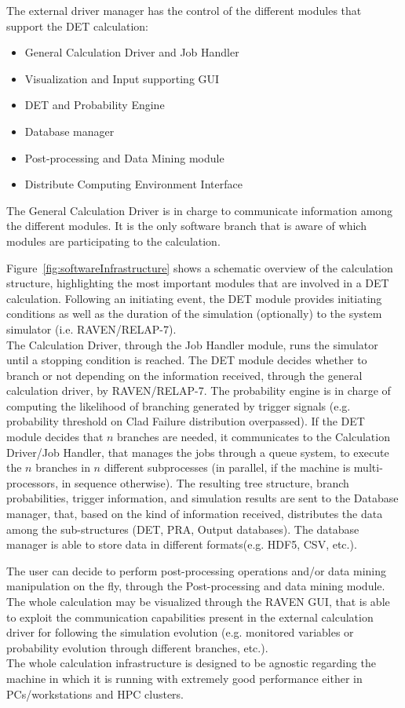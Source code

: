 The external driver manager has the control of the different modules that support the DET calculation:
\vspace{-5mm}
\begin{itemize}
\itemsep0em
\item General Calculation Driver and Job Handler
\item Visualization and Input supporting GUI
\item DET and Probability Engine
\item Database manager
\item Post-processing and Data Mining module
\item Distribute Computing Environment Interface
\end{itemize}
\vspace{-5mm}
The General Calculation Driver is in charge to communicate information among the different modules. It is the only software branch that is aware of which modules are participating to the calculation.   

Figure~\ref{fig:softwareInfrastructure} shows a schematic overview of the calculation structure, highlighting the most important modules that are involved in a DET calculation. Following an initiating event, the DET module provides initiating conditions as well as the duration of the simulation (optionally) to the system simulator (i.e. RAVEN/RELAP-7). 
\\The Calculation Driver, through the Job Handler module, runs the simulator until a stopping condition is reached. The DET module decides whether to branch or not depending on the information received, through the general calculation driver, by RAVEN/RELAP-7. 
The probability engine is in charge of computing the likelihood of branching generated by trigger signals (e.g. probability threshold on Clad Failure distribution overpassed).  If the DET module decides that $n$ branches are needed, it communicates to the Calculation Driver/Job Handler, that manages the jobs through a queue system, to execute the $n$ branches in $n$ different subprocesses (in parallel, if the machine is multi-processors, in sequence otherwise). The resulting tree structure, branch probabilities, trigger information, and simulation results are sent to the Database manager, that, based on the kind of information received, distributes the data among the sub-structures (DET, PRA, Output databases). The database manager is able to store data in different formats(e.g. HDF5, CSV, etc.). 

The user can decide to perform post-processing operations and/or data mining manipulation on the fly, through the Post-processing and data mining module. The whole calculation may be visualized through the RAVEN GUI, that is able to exploit the communication capabilities present in the external calculation driver for following the simulation evolution (e.g. monitored variables or probability evolution through different branches, etc.). \\ The whole calculation infrastructure is designed to be agnostic regarding the machine in which it is running with extremely good performance either in PCs/workstations and HPC clusters. 